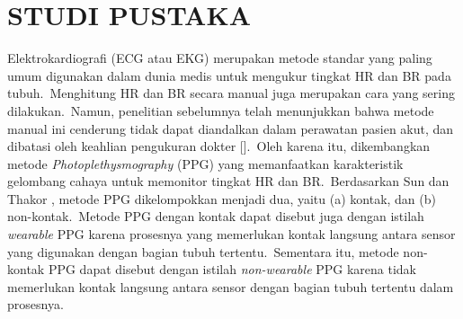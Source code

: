 
\chapter{STUDI PUSTAKA}

\ifpdf
    \graphicspath{{Chapter2/Figs/Raster/}{Chapter2/Figs/PDF/}{Chapter2/Figs/}}
\else
    \graphicspath{{Chapter2/Figs/Vector/}{Chapter2/Figs/}}
\fi

Elektrokardiografi (ECG atau EKG) merupakan metode standar yang paling umum digunakan dalam dunia medis untuk mengukur tingkat HR dan BR pada tubuh.~Menghitung HR dan BR secara manual juga merupakan cara yang sering dilakukan.~Namun, penelitian sebelumnya telah menunjukkan bahwa metode manual ini cenderung tidak dapat diandalkan dalam perawatan pasien akut, dan dibatasi oleh keahlian pengukuran dokter [\citet{hillman2005}].~Oleh karena itu, dikembangkan metode \textit{Photoplethysmography} (PPG) yang memanfaatkan karakteristik gelombang cahaya untuk memonitor tingkat HR dan BR.~Berdasarkan Sun dan Thakor \citep{sun2016}, metode PPG dikelompokkan menjadi dua, yaitu (a) kontak, dan (b) non-kontak.~Metode PPG dengan kontak dapat disebut juga dengan istilah \textit{wearable} PPG karena prosesnya yang memerlukan kontak langsung antara sensor yang digunakan dengan bagian tubuh tertentu.~Sementara itu, metode non-kontak PPG dapat disebut dengan istilah \textit{non-wearable} PPG karena tidak memerlukan kontak langsung antara sensor dengan bagian tubuh tertentu dalam prosesnya.




